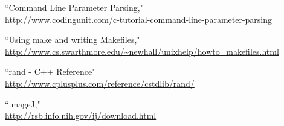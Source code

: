 \documentclass[times, 12pt]{article}
\begin{document}

\begin{thebibliography}{1}
``Command Line Parameter Parsing,"\\
\url{http://www.codingunit.com/c-tutorial-command-line-parameter-parsing}


``Using make and writing Makefiles,"\\
\url{http://www.cs.swarthmore.edu/~newhall/unixhelp/howto_makefiles.html}

``rand - C++ Reference"\\
\url{http://www.cplusplus.com/reference/cstdlib/rand/}

``imageJ,"\\
\url{http://rsb.info.nih.gov/ij/download.html}
\end{thebibliography}
\end{document}
